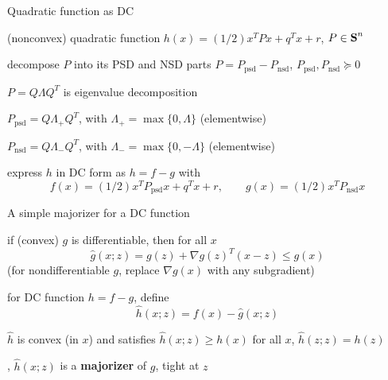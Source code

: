 \documentclass[aspectratio=169,11pt]{beamer}
\begin{document}
\begin{frame}{Quadratic function as DC}
\BIT
\item (nonconvex) quadratic function $h(x)= (1/2)x^TPx+q^Tx + r$, $P\in {\mbox{\bfseries\rmfamily S}}^n$
\item decompose $P$ into its PSD and NSD parts $P=P_\text{psd} - P_\text{nsd}$, 
$P_\text{psd},P_\text{nsd}\succeq 0$
\BIT
\item $P = Q\Lambda Q^T$ is eigenvalue decomposition
\item $P_\text{psd} = Q\Lambda_+ Q^T$, with 
$\Lambda_+ = \max\{0,\Lambda\}$ (elementwise)
\item $P_\text{nsd} = Q\Lambda_- Q^T$, with 
$\Lambda_- = \max\{0,-\Lambda\}$ (elementwise)
\EIT
\item express $h$ in DC form as $h=f-g$ with
\[
f(x)= (1/2)x^TP_\text{psd}x+q^Tx + r, \qquad g(x)=(1/2)x^TP_\text{nsd}x 
\]
\EIT
\end{frame}

\begin{frame}{A simple majorizer for a DC function}
\BIT
\item if (convex) $g$ is differentiable, then for all $x$
\[
\hat g(x;z) = g(z)+ \nabla g(z)^T (x-z) \leq g(x)
\]
(for nondifferentiable $g$, replace $\nabla g(x)$ with any subgradient)
\item for DC function $h=f-g$, define
\[
\hat h(x;z)= f(x)-\hat g(x;z)
\]
\item $\hat h$ is convex (in $x$) and satisfies
$\hat h(x;z) \geq h(x)$ for all $x$,
$\hat h(z;z) = h(z)$
\item \ie,
$\hat h(x;z)$ is a \textbf{majorizer} of $g$, tight at $z$
\EIT
\end{frame}
\end{document}
